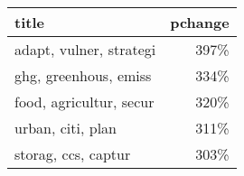 \begin{tabular}{p{1.2cm}r}
\toprule
                   title &  pchange \\
\midrule
 adapt, vulner, strategi &     397\% \\
   ghg, greenhous, emiss &     334\% \\
 food, agricultur, secur &     320\% \\
       urban, citi, plan &     311\% \\
     storag, ccs, captur &     303\% \\
\bottomrule
\end{tabular}
